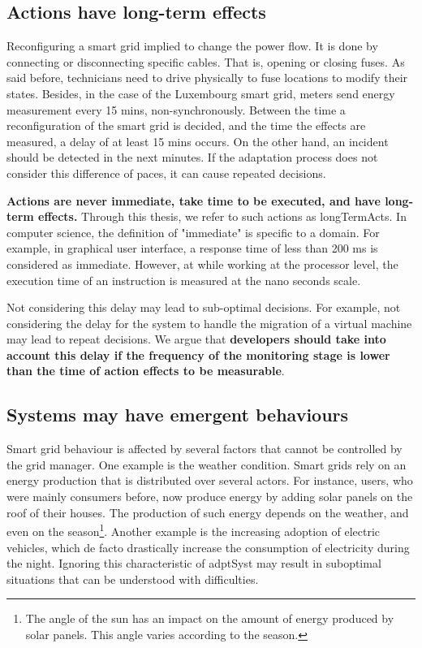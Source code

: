 \subsection{Actions have long-term effects}
Reconfiguring a smart grid implied to change the power flow.
It is done by connecting or disconnecting specific cables.
That is, opening or closing fuses.
As said before, technicians need to drive physically to fuse locations to modify their states.
Besides, in the case of the Luxembourg smart grid, meters send energy measurement every 15 mins, non-synchronously.
Between the time a reconfiguration of the smart grid is decided, and the time the effects are measured, a delay of at least 15 mins occurs.
On the other hand, an incident should be detected in the next minutes.
If the adaptation process does not consider this difference of paces, it can cause repeated decisions.

\textbf{Actions are never immediate, take time to be executed, and have long-term effects.}
Through this thesis, we refer to such actions as \glspl{longTermAct}.
In computer science, the definition of "immediate" is specific to a domain.
For example, in graphical user interface, a response time of less than 200 ms is considered as immediate.
However, at while working at the processor level, the execution time of an instruction is measured at the nano seconds scale.

Not considering this delay may lead to sub-optimal decisions.
For example, not considering the delay for the system to handle the migration of a virtual machine may lead to repeat decisions.
We argue that \textbf{developers should take into account this delay if the frequency of the monitoring stage is lower than the time of action effects to be measurable}.

\subsection{Systems may have emergent behaviours}
Smart grid behaviour is affected by several factors that cannot be controlled by the grid manager.
One example is the weather condition.
Smart grids rely on an energy production that is distributed over several actors.
For instance, users, who were mainly consumers before, now produce energy by adding solar panels on the roof of their houses.
The production of such energy depends on the weather, and even on the season\footnote{The angle of the sun has an impact on the amount of energy produced by solar panels. This angle varies according to the season.}.
Another example is the increasing adoption of electric vehicles, which de facto drastically increase the consumption of electricity during the night.
Ignoring this characteristic of \gls{adptSyst} may result in suboptimal situations that can be understood with difficulties.

